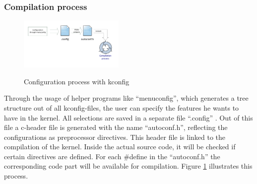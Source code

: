 \documentclass{sig-alternate-05-2015}
\begin{document}
\subsubsection{Compilation process}
\begin{figure}[h]
\centering
\includegraphics[width= 0.45\textwidth ]{img/kconfig-compil.pdf}
\label{kconfig-compil}
\caption{Configuration process with kconfig}
\end{figure}
Through the usage of helper programs like ``menuconfig'', which generates a tree structure out of all kconfig-files, the user can specify the features he wants to have in the kernel. All selections are saved in a separate file ``.config'' . Out of this file a c-header file is generated with the name ``autoconf.h'', reflecting the configurations as preprocessor directives. This header file is linked to the compilation of the kernel. Inside the actual source code, it will be checked if certain directives are defined. For each \#define in the ``autoconf.h'' the corresponding code part will be available for compilation. Figure \ref{kconfig-compil} illustrates this process.




\end{document}

